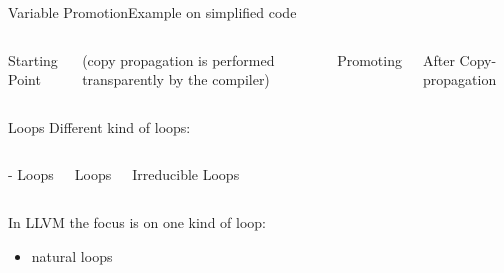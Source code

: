 \begin{frame}{Variable Promotion}{Example on simplified code}
\begin{columns}[t]
\begin{block}{Starting Point}
\end{block}

(copy propagation is performed transparently by the compiler)

\begin{block}{Promoting }
\end{block}

\begin{block}{After Copy-propagation}
\end{block}

\end{columns}
\end{frame}


\begin{frame}{Loops}
Different kind of loops:

\begin{columns}[t]
\begin{block}{- Loops}
\centering

\end{block}

\begin{block}{ Loops}
\centering

\end{block}

\begin{block}{Irreducible Loops}
\centering

\end{block}
\end{columns}

\bigskip
In LLVM the focus is on one kind of loop:

\begin{itemize}
\item natural loops
\end{itemize}
\end{frame}

